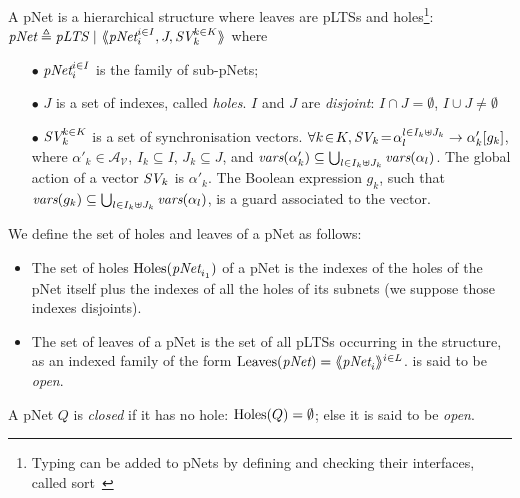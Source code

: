 \documentclass{llncs}
\newcommand{\cA}{\ensuremath{\mathcal{A}}}
\newcommand{\cV}{\ensuremath{\mathcal{V}}}
\newcommand{\variables}{\ensuremath{\cV}}
\newcommand{\actions}[1]{\ensuremath{\cA_{#1}}}
\begin{document}
\begin{definition}[pNets]\label{defn:pnets}
A pNet is a hierarchical structure where leaves are pLTSs and holes\footnote{Typing can 
be added to pNets by defining and checking their interfaces, called 
sort~\cite{HMZ-FORTE2016}}:
$\pNet\triangleq \pLTS~|~\mylangle \pNet_i^{i\in I}, J, \symb{SV}_k^{k\in 
K}\myrangle$
where
\begin{itemize}
\item[$\bullet$] $\pNet_i^{i\in I}$ is the family of sub-pNets;

\item[$\bullet$] $J$ is a set of indexes, called \emph{holes}.
$I$ and $J$ are \emph{disjoint}: $I\!\cap\! J=\emptyset$,  $I\!\cup\! J\neq\emptyset$

\item[$\bullet$] $\symb{SV}_k^{k\in K}$ is a set of
  synchronisation vectors. %
$\forall k\!\in\! K,
  \symb{SV}_k\!=\SV{\!\alpha_{l}^{l\in I_k \uplus J_k}}{\alpha'_k}{g_k}$, where
  $\alpha'_k\in \actions{\variables}$, $I_k\subseteq I$, $J_k\subseteq J$, and 
  $\vars(\alpha'_k)\subseteq \bigcup_{l\in I_k\uplus 
  J_k}{\vars({\alpha_l})}$. The global action of a vector $\symb{SV}_k$ is
$\alpha'_k$. The Boolean expression $g_k $, such that $\vars(g_k)\subseteq \bigcup_{l\in 
I_k\uplus J_k}{\vars({\alpha_l})}$, is a guard associated to the vector.


\end{itemize}
We define the set of holes and leaves of a pNet as follows:
  \begin{itemize}
\item
The set of holes $\Holes(\pNet_{i_1})$ of a pNet is the indexes of the holes of the pNet 
itself plus the indexes of all the holes of its subnets (we suppose those indexes 
disjoints).
%
\item
The set of leaves of a pNet is the set of all pLTSs occurring in the structure, as an 
indexed family of the form $\Leaves(\pNet)= \mylangle \pNet_i \myrangle^{i \in L}$.
is said to be \emph{open}.
\end{itemize}
A pNet $Q$ is \emph{closed} if it has no hole: $\operatorname{Holes}(Q)=\emptyset$; else it
is said to be \emph{open}.
\end{definition}
\end{document}

